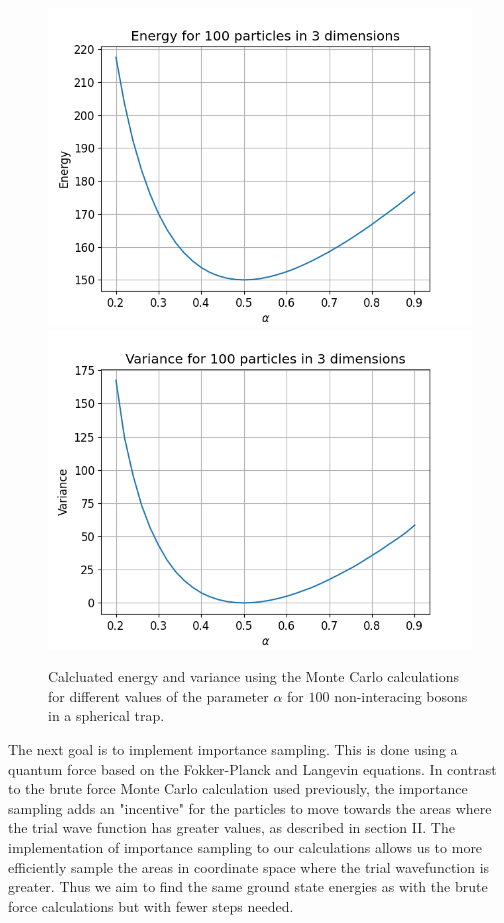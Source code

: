 \documentclass[a4paper, 10pt, english]{revtex4-2} %
\begin{document}
    \begin{figure}[!ht]
        \centering
        \includegraphics[width=\imwidth]{figures/Energy_B_100.png}
        \includegraphics[width=\imwidth]{figures/Varience_B_100.png}
        \caption{Calcluated energy and variance using the Monte Carlo calculations for different values of the parameter $\alpha$ for $100$ non-interacing bosons in a spherical trap.}
        \label{fig: B100}
    \end{figure}\newpage
    

    The next goal is to implement importance sampling.
    This is done using a quantum force based on the Fokker-Planck and Langevin equations.
    In contrast to the brute force Monte Carlo calculation used previously, the importance sampling adds an "incentive" for the particles to move towards the areas where the trial wave function has greater values, as described in section II.
    The implementation of importance sampling to our calculations allows us to more efficiently sample the areas in coordinate space where the trial wavefunction is greater.
    Thus we aim to find the same ground state energies as with the brute force calculations but with fewer steps needed.
\end{document}
